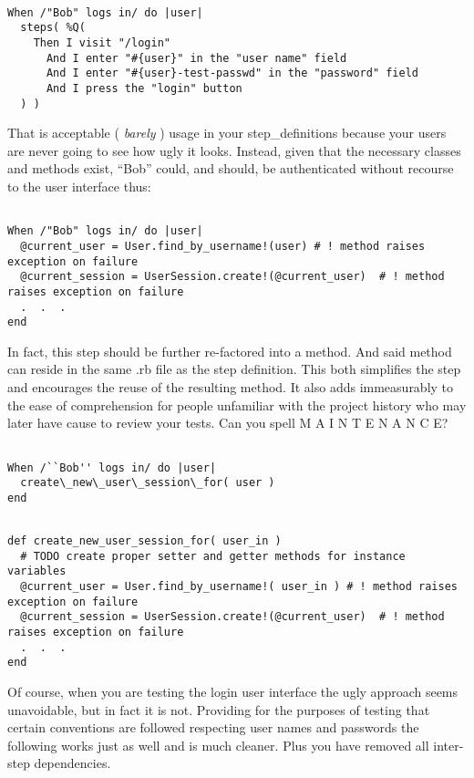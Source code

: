 \begin{verbatim}

When /"Bob" logs in/ do |user|
  steps( %Q(
    Then I visit "/login"
      And I enter "#{user}" in the "user name" field
      And I enter "#{user}-test-passwd" in the "password" field
      And I press the "login" button
  ) )

\end{verbatim}
That is acceptable ( \emph{barely} ) usage in your step\_definitions because your users are never going to see how ugly it looks. Instead, given that the necessary classes and methods exist, ``Bob'' could, and should, be authenticated without recourse to the user interface thus:

\begin{verbatim}

When /"Bob" logs in/ do |user|
  @current_user = User.find_by_username!(user) # ! method raises exception on failure
  @current_session = UserSession.create!(@current_user)  # ! method raises exception on failure
  .  .  .
end

\end{verbatim}
In fact, this step should be further re-factored into a method.  And said method can reside in the same .rb file as the step definition.  This both simplifies the step and encourages the reuse of the resulting method.  It also adds immeasurably to the ease of comprehension for people unfamiliar with the project history who may later have cause to review your tests.  Can you spell M A I N T E N A N C E?
\begin{verbatim}

When /``Bob'' logs in/ do |user|
  create\_new\_user\_session\_for( user )
end

\end{verbatim}

\begin{verbatim}

def create_new_user_session_for( user_in )
  # TODO create proper setter and getter methods for instance variables
  @current_user = User.find_by_username!( user_in ) # ! method raises exception on failure
  @current_session = UserSession.create!(@current_user)  # ! method raises exception on failure
  .  .  .
end

\end{verbatim}
Of course, when you are testing the login user interface the ugly approach seems unavoidable, but in fact it is not. Providing for the purposes of testing that certain conventions are followed respecting user names and passwords the following works just as well and is much cleaner.  Plus you have removed all inter-step dependencies.

